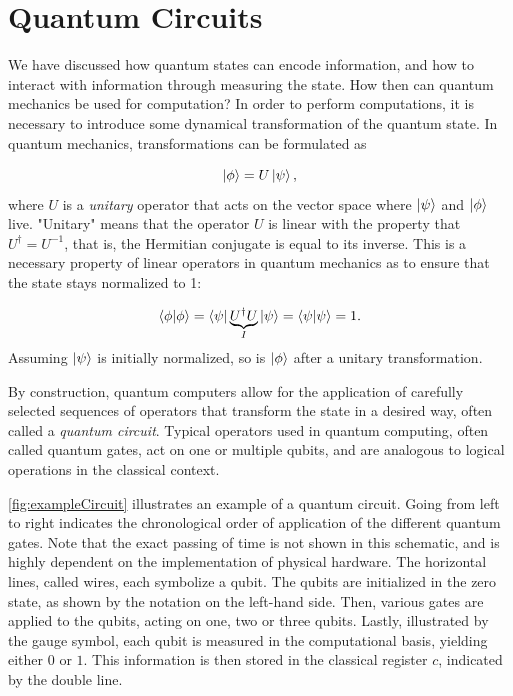 \section{Quantum Circuits}\label{sec:QuantumCircuits}
We have discussed how quantum states can encode information, and how to interact with information through measuring the state. How then can quantum mechanics be used for computation? In order to perform computations, it is necessary to introduce some dynamical transformation of the quantum state. In quantum mechanics, transformations can be formulated as 

\begin{equation}\label{eq:UnitaryEvolution}
 \ket{\phi} = U\ket{\psi},
\end{equation}
where $U$ is a \emph{unitary} operator that acts on the vector space where $\ket{\psi}$ and $\ket{\phi}$ live. "Unitary" means that the operator $U$ is linear with the property that $U^{\dagger} = U^{-1}$, that is, the Hermitian conjugate is equal to its inverse. This is a necessary property of linear operators in quantum mechanics as to ensure that the state stays normalized to 1:

\begin{equation}\label{eq:UnitaryEvolution}
 \braket{\phi}{\phi} = \bra{\psi}\underset{I}{\underbrace{U^{\dagger}U}}\ket{\psi} = \bra{\psi}\ket{\psi} =1.
\end{equation}
Assuming $\ket{\psi}$ is initially normalized, so is $\ket{\phi}$ after a unitary transformation.

By construction, quantum computers allow for the application of carefully selected sequences of operators that transform the state in a desired way, often called a \emph{quantum circuit}. Typical operators used in quantum computing, often called quantum gates, act on one or multiple qubits, and are analogous to logical operations in the classical context. 

\cref{fig:exampleCircuit} illustrates an example of a quantum circuit. Going from left to right indicates the chronological order of application of the different quantum gates. Note that the exact passing of time is not shown in this schematic, and is highly dependent on the implementation of physical hardware. The horizontal lines, called wires, each symbolize a qubit. The qubits are initialized in the zero state, as shown by the notation on the left-hand side. Then, various gates are applied to the qubits, acting on one, two or three qubits. Lastly, illustrated by the gauge symbol, each qubit is measured in the computational basis, yielding either $0$ or $1$. This information is then stored in the classical register $c$, indicated by the double line. 

